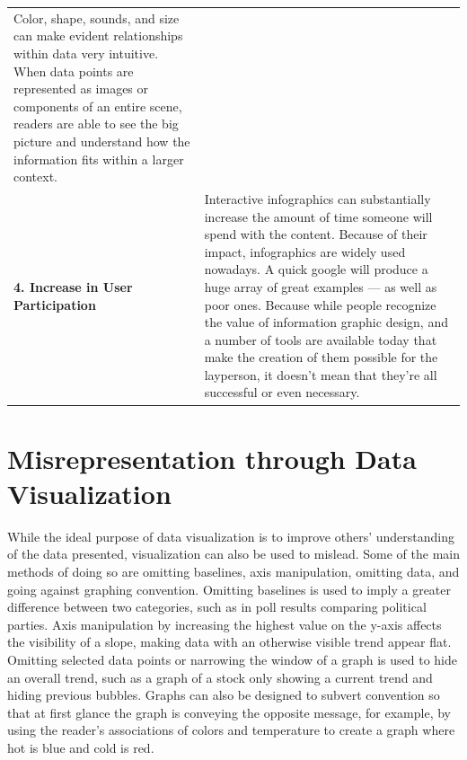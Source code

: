 \documentclass[]{book}
\theoremstyle{definition}
\theoremstyle{definition}
\theoremstyle{definition}
\theoremstyle{remark}
\begin{document}
\begin{longtable}[]{@{}ll@{}}
\begin{minipage}[t]{0.78\columnwidth}
Color, shape, sounds, and size can make evident relationships within
data very intuitive. When data points are represented as images or
components of an entire scene, readers are able to see the big picture
and understand how the information fits within a larger context.\strut
\end{minipage}\tabularnewline
\begin{minipage}[t]{0.16\columnwidth}\raggedright\strut
\textbf{4. Increase in User Participation}\strut
\end{minipage} & \begin{minipage}[t]{0.78\columnwidth}\raggedright\strut
Interactive infographics can substantially increase the amount of time
someone will spend with the content. Because of their impact,
infographics are widely used nowadays. A quick google will produce a
huge array of great examples --- as well as poor ones. Because while
people recognize the value of information graphic design, and a number
of tools are available today that make the creation of them possible for
the layperson, it doesn't mean that they're all successful or even
necessary.\strut
\end{minipage}\tabularnewline
\bottomrule
\end{longtable}

\section{Misrepresentation through Data
Visualization}\label{misrepresentation-through-data-visualization}

While the ideal purpose of data visualization is to improve others'
understanding of the data presented, visualization can also be used to
mislead. Some of the main methods of doing so are omitting baselines,
axis manipulation, omitting data, and going against graphing convention.
Omitting baselines is used to imply a greater difference between two
categories, such as in poll results comparing political parties. Axis
manipulation by increasing the highest value on the y-axis affects the
visibility of a slope, making data with an otherwise visible trend
appear flat. Omitting selected data points or narrowing the window of a
graph is used to hide an overall trend, such as a graph of a stock only
showing a current trend and hiding previous bubbles. Graphs can also be
designed to subvert convention so that at first glance the graph is
conveying the opposite message, for example, by using the reader's
associations of colors and temperature to create a graph where hot is
blue and cold is red.
\end{document}
